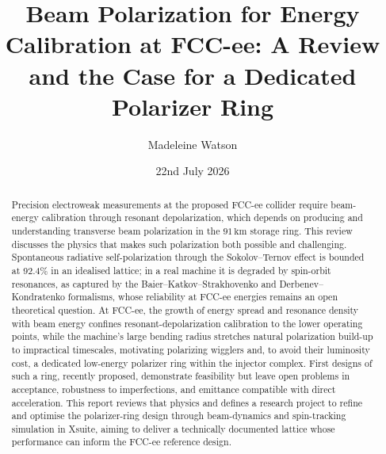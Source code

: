 \documentclass[%
 aip,
 amsmath,amssymb,
 reprint,%
superscriptaddress
]{revtex4-2}
\begin{document}

\title[]{Beam Polarization for Energy Calibration at FCC-ee: A Review and the Case for a Dedicated Polarizer Ring}

\author{Madeleine Watson}
 
%
%


\date{22nd July 2026}%


\begin{abstract}
Precision electroweak measurements at the proposed FCC-ee collider require beam-energy calibration through resonant depolarization, which depends on producing and understanding transverse beam polarization in the $91\,\text{km}$ storage ring. This review discusses the physics that makes such polarization both possible and challenging. Spontaneous radiative self-polarization through the Sokolov–Ternov effect is bounded at 92.4\% in an idealised lattice; in a real machine it is degraded by spin-orbit resonances, as captured by the Baier–Katkov–Strakhovenko and Derbenev–Kondratenko formalisms, whose reliability at FCC-ee energies remains an open theoretical question. At FCC-ee, the growth of energy spread and resonance density with beam energy confines resonant-depolarization calibration to the lower operating points, while the machine's large bending radius stretches natural polarization build-up to impractical timescales, motivating polarizing wigglers and, to avoid their luminosity cost, a dedicated low-energy polarizer ring within the injector complex. First designs of such a ring, recently proposed, demonstrate feasibility but leave open problems in acceptance, robustness to imperfections, and emittance compatible with direct acceleration. This report reviews that physics and defines a research project to refine and optimise the polarizer-ring design through beam-dynamics and spin-tracking simulation in Xsuite, aiming to deliver a technically documented lattice whose performance can inform the FCC-ee reference design.
\end{abstract}

\maketitle
\end{document}
